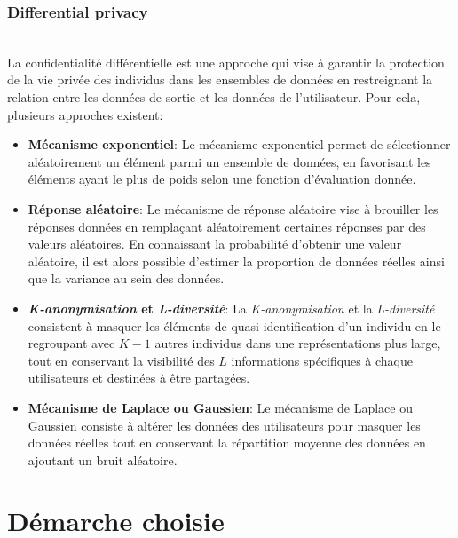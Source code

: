 \documentclass{article}
\begin{document}
\subsubsection{Differential privacy}
$ $\\
La confidentialité différentielle est une approche qui vise à garantir la protection de la vie privée des individus dans les ensembles de données en restreignant la relation entre les données de sortie et les données de l'utilisateur.
Pour cela, plusieurs approches existent:\\
\begin{itemize}
\item \textbf{Mécanisme exponentiel}: Le mécanisme exponentiel permet de sélectionner aléatoirement un élément parmi un ensemble de données, en favorisant les éléments ayant le plus de poids selon une fonction d'évaluation donnée.
\item \textbf{Réponse aléatoire}: Le mécanisme de réponse aléatoire vise à brouiller les réponses données en remplaçant aléatoirement certaines réponses par des valeurs aléatoires.
En connaissant la probabilité d'obtenir une valeur aléatoire, il est alors possible d'estimer la proportion de données réelles ainsi que la variance au sein des données.
\item \textbf{\emph{K-anonymisation} et \emph{L-diversité}}: La \emph{K-anonymisation} et la \emph{L-diversité} consistent à masquer les éléments de quasi-identification d'un individu en le regroupant avec $K-1$ autres individus dans une représentations plus large, tout en conservant la visibilité des $L$ informations spécifiques à chaque utilisateurs et destinées à être partagées.
\item \textbf{Mécanisme de Laplace ou Gaussien}: Le mécanisme de Laplace ou Gaussien consiste à altérer les données des utilisateurs pour masquer les données réelles tout en conservant la répartition moyenne des données en ajoutant un bruit aléatoire.
\end{itemize}
\section{Démarche choisie}
\end{document}
